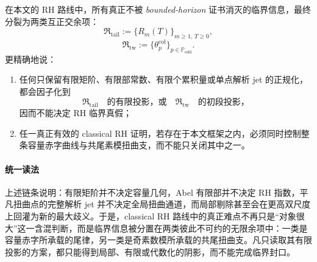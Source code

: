 \begin{conjecture}\label{conj:conclusion-rh-tail-twist-dual-obstruction}
在本文的 RH 路线中，所有真正不被 \textit{bounded-horizon} 证书消灭的临界信息，最终分裂为两类互正交余项：
\[
\mathfrak R_{\mathrm{tail}}
:=
\{R_m(T)\}_{m\ge 1,\ T\ge 0},
\]
\[
\mathfrak R_{\mathrm{tw}}
:=
\{\theta_p^{\mathrm{col}}\}_{p\in\mathbb P_{\mathrm{odd}}}.
\]
更精确地说：
\begin{enumerate}
  \item 任何只保留有限矩阶、有限部常数、有限个累积量或单点解析 jet 的正规化，都会因子化到
  \[
  \mathfrak R_{\mathrm{tail}}
  \quad\text{的有限投影，或}\quad
  \mathfrak R_{\mathrm{tw}}
  \quad\text{的初段投影，}
  \]
  因而不能决定 RH 临界真假；
  \item 任一真正有效的 classical RH 证明，若存在于本文框架之内，必须同时控制整条容量赤字曲线与共尾素模扭曲支，而不能只关闭其中之一。
\end{enumerate}
\end{conjecture}

\paragraph{统一读法}
上述链条说明：有限矩阶并不决定容量几何，Abel 有限部并不决定 RH 指数，平凡扭曲点的完整解析 jet 并不决定全局扭曲通道，而局部剔除甚至会在更高双尺度上回灌为新的最大歧义。于是，classical RH 路线中的真正难点不再只是“对象很大”这一含混判断，而是临界信息被分置在两类彼此不可约的无限余项中：一类是容量赤字所承载的尾律，另一类是奇素数模所承载的共尾扭曲支。凡只读取其有限投影的方案，都只能得到局部、有限或代数化的阴影，而不能完成临界封口。

\endinput
